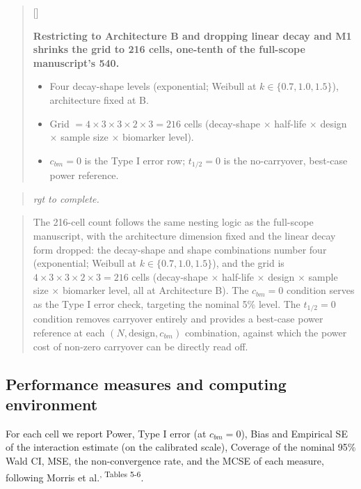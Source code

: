 \documentclass[
  11pt,
]{article}
\newcounter{pgraph}
\newenvironment{bullets}{%
  \stepcounter{pgraph}%
  \begin{quote}\small\sffamily\color[gray]{0.30}%
  {\normalfont\scriptsize\color[gray]{0.58}[\thepgraph]\enspace}}{%
  \end{quote}}
\newenvironment{rgt}{%
  \begin{quote}\small\itshape\color[RGB]{20,60,160}}{%
  \end{quote}}
\newenvironment{orig}{%
  \begin{quote}\normalsize\color[gray]{0.55}}{%
  \end{quote}}
\begin{document}
\begin{bullets}

\textbf{Restricting to Architecture B and dropping linear decay and
M1 shrinks the grid to 216 cells, one-tenth of the full-scope
manuscript's 540.}

\begin{itemize}\setlength{\itemsep}{2pt}\setlength{\parskip}{0pt}
\item Four decay-shape levels (exponential; Weibull at
$k \in \{0.7, 1.0, 1.5\}$), architecture fixed at B.
\item Grid $= 4 \times 3 \times 3 \times 2 \times 3 = 216$ cells
(decay-shape $\times$ half-life $\times$ design $\times$ sample size
$\times$ biomarker level).
\item $c_{bm} = 0$ is the Type I error row; $t_{1/2} = 0$ is the
no-carryover, best-case power reference.
\end{itemize}

\end{bullets}

\begin{rgt}
rgt to complete.

\end{rgt}

\begin{orig}
The 216-cell count follows the same nesting logic as the full-scope
manuscript, with the architecture dimension fixed and the linear
decay form dropped: the decay-shape and shape combinations number
four (exponential; Weibull at \(k \in \{0.7, 1.0, 1.5\}\)), and the
grid is \(4 \times 3 \times 3 \times 2 \times 3 = 216\) cells
(decay-shape \(\times\) half-life \(\times\) design \(\times\) sample size
\(\times\) biomarker level, all at Architecture B). The
\(c_{bm} = 0\) condition serves as the Type I error check, targeting
the nominal 5\% level. The \(t_{1/2} = 0\) condition removes carryover
entirely and provides a best-case power reference at each
\((N, \text{design}, c_{bm})\) combination, against which the power
cost of non-zero carryover can be directly read off.

\end{orig}

\subsection{Performance measures and computing environment}\label{performance-measures-and-computing-environment}

For each cell we report Power, Type I error (at \(c_{bm} = 0\)), Bias
and Empirical SE of the interaction estimate (on the calibrated
scale), Coverage of the nominal 95\% Wald CI, MSE, the
non-convergence rate, and the MCSE of each measure, following Morris
et al.\textsuperscript{, Tables 5-6}.
\end{document}
